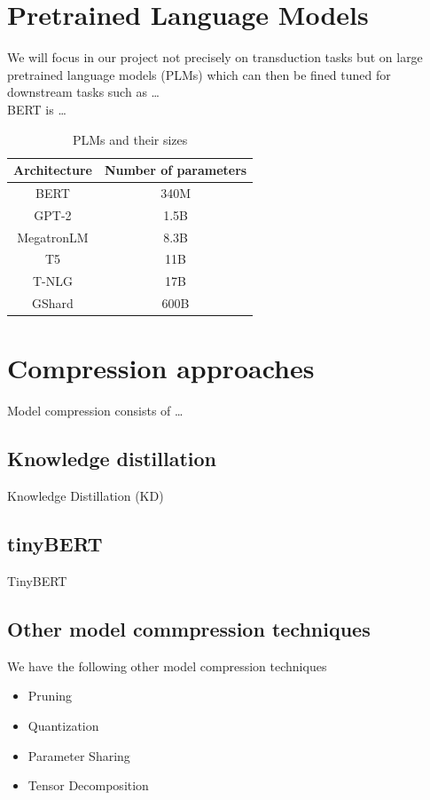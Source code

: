 \documentclass{article}
\begin{document}
%

\section*{Pretrained Language Models}
We will focus in our project not precisely on transduction tasks but on large
pretrained language models (PLMs) which can then be fined tuned for downstream
tasks such as \ldots\\



%
BERT is \ldots\cite{bert}\\


\begin{table}[h]
  \centering
  \begin{tabular}{cc}
    Architecture & Number of parameters\\
    \hline
    BERT & 340M\\
    GPT-2 & 1.5B\\
    MegatronLM & 8.3B\\
    T5 & 11B\\
    T-NLG & 17B\\
    GShard & 600B
  \end{tabular}
  \caption{PLMs and their sizes}
\end{table}

\section*{Compression approaches}
Model compression consists of \ldots

\subsection*{Knowledge distillation}
%
Knowledge Distillation (KD)\cite{hinton2015distilling}

\subsection*{tinyBERT}
%
TinyBERT\cite{tinybert}

\subsection*{Other model commpression techniques}
%
We have the following other model compression techniques\cite{gupta2020compression}
\begin{itemize}
  \item Pruning
  \item Quantization
  \item Parameter Sharing
  \item Tensor Decomposition
\end{itemize}
\end{document}
